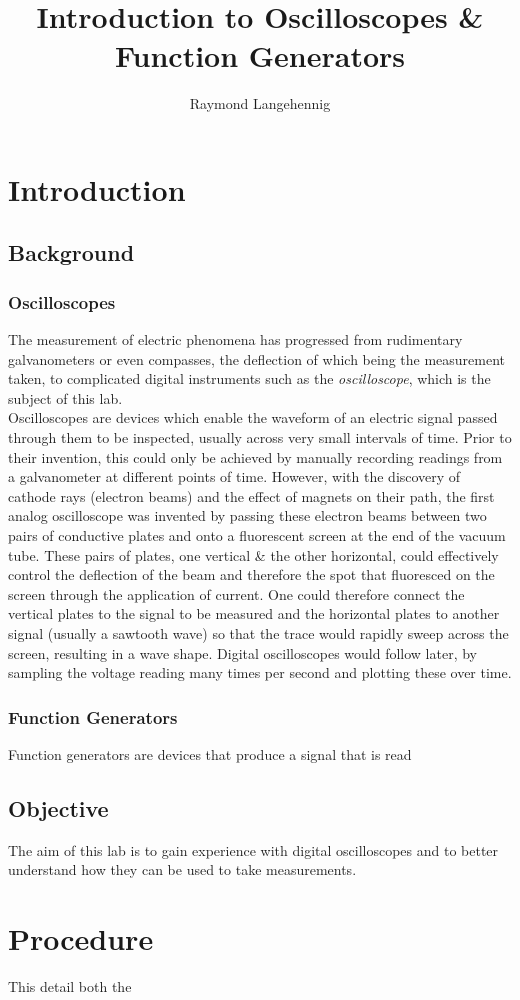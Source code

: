 \documentclass{article}
\title{Introduction to Oscilloscopes \& Function Generators}
\author{Raymond Langehennig}
\begin{document}
\maketitle

\section{Introduction}
    \subsection{Background}
        \subsubsection{Oscilloscopes}
            The measurement of electric phenomena has progressed from rudimentary galvanometers or even compasses, the deflection of which being the measurement taken, to complicated digital instruments such as the \emph{oscilloscope}, which is the subject of this lab.\\
            Oscilloscopes are devices which enable the waveform of an electric signal passed through them to be inspected, usually across very small intervals of time. Prior to their invention, this could only be achieved by manually recording readings from a galvanometer at different points of time. However, with the discovery of cathode rays (electron beams) and the effect of magnets on their path, the first analog oscilloscope was invented by passing these electron beams between two pairs of conductive plates and onto a fluorescent screen at the end of the vacuum tube. These pairs of plates, one vertical \& the other horizontal, could effectively control the deflection of the beam and therefore the spot that fluoresced on the screen through the application of current. One could therefore connect the vertical plates to the signal to be measured and the horizontal plates to another signal (usually a sawtooth wave) so that the trace would rapidly sweep across the screen, resulting in a wave shape. Digital oscilloscopes would follow later, by sampling the voltage reading many times per second and plotting these over time.
        
        \subsubsection{Function Generators}
            Function generators are devices that produce a signal that is read 

    \subsection{Objective}
    The aim of this lab is to gain experience with digital oscilloscopes and to better understand how they can be used to take measurements. 

\section{Procedure}
    This detail both the 



\section{}
\end{document}
